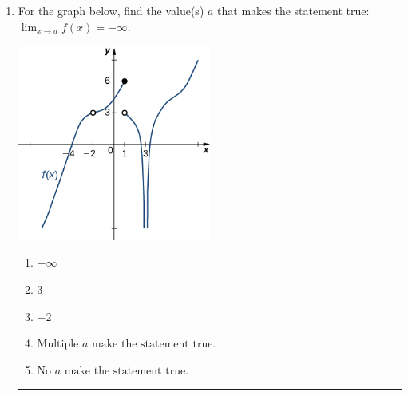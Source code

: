\documentclass[14pt]{extbook}
\newcommand{\litem}[1]{\item#1\hspace*{-1cm}\rule{\textwidth}{0.4pt}}
\begin{document}
\begin{enumerate}
{\begin{enumerate}[label=\Alph*.]
\end{enumerate} }
\litem{
For the graph below, find the value(s) $a$ that makes the statement true: $ \displaystyle \lim_{x \rightarrow a} f(x) = -\infty$.
\begin{center}
    \includegraphics[width=0.5\textwidth]{../Figures/evaluateLimitGraphicallyC.png}
\end{center}
\begin{enumerate}[label=\Alph*.]
\item \( -\infty \)
\item \( 3 \)
\item \( -2 \)
\item \( \text{Multiple } a \text{ make the statement true}. \)
\item \( \text{No } a \text{ make the statement true}. \)

\end{enumerate} }
\end{enumerate}
\end{document}
